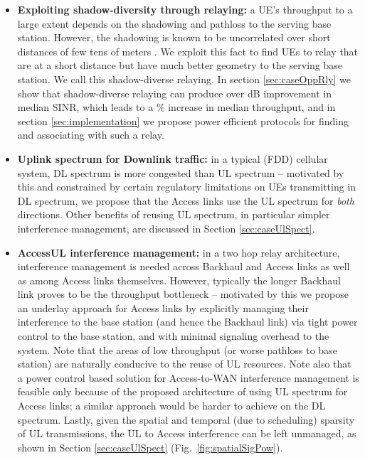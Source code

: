 \documentclass[journal]{IEEEtran}
\begin{document}
\begin{itemize}
    \item {\bf Exploiting shadow-diversity through relaying:} a UE's throughput to a large extent depends on the shadowing and pathloss to the serving base station. However, the shadowing is known to be uncorrelated over short distances of few tens of meters \cite[Sec.~B.1.2.1.1]{3GPP36814}\cite{Gudmundson91}. We exploit this fact to find UEs to relay that are at a short distance but have much better geometry to the serving base station.  We call this shadow-diverse relaying. In section \ref{sec:caseOppRly} we show that shadow-diverse relaying can produce over  dB improvement in median SINR, which leads to a \% increase in median throughput, and in section \ref{sec:implementation} we propose power efficient protocols for finding and associating with such a relay.
    \item {\bf Uplink spectrum for Downlink traffic:} in a typical (FDD) cellular system, DL spectrum is more congested than UL spectrum -- motivated by this and constrained by certain regulatory limitations on UEs transmitting in DL spectrum, we propose that the Access links use the UL spectrum for {\em both} directions. Other benefits of reusing UL spectrum, in particular simpler interference management, are discussed in Section \ref{sec:caseUlSpect}.
    \item {\bf AccessUL interference management:} in a two hop relay architecture, interference management is needed across Backhaul and Access links as well as among Access links themselves.  However, typically the longer Backhaul link proves to be the throughput bottleneck -- motivated by this we propose an underlay approach for Access links by explicitly managing their interference to the base station (and hence the Backhaul link) via tight power control to the base station, and with minimal signaling overhead to the system.  Note that the areas of low throughput (or worse pathloss to base station) are naturally conducive to the reuse of UL resources.  Note also that a power control based solution for Access-to-WAN interference management is feasible only because of the proposed architecture of using UL spectrum for Access links; a similar approach would be harder to achieve on the DL spectrum.  Lastly, given the spatial and temporal (due to scheduling) sparsity of UL transmissions, the UL to Access interference can be left unmanaged, as shown in  Section \ref{sec:caseUlSpect} (Fig.~\ref{fig:spatialSigPow}).
\end{itemize}
\end{document}
